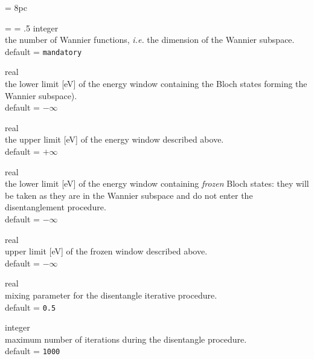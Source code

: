 \newdimen\descindent \descindent = 8pc
{\noindent \leftskip = \descindent \parskip = .5\baselineskip
{}%
{\sc integer} \\ the number of Wannier functions, {\it i.e.} the dimension of the 
Wannier subspace.
\\ {\sc default} = {\tt mandatory} \par

\noindent{}%
{\sc real} \\ the lower limit [eV] of the energy window containing the Bloch states
forming the Wannier subspace).\\ 
{\sc default} = {\tt $-\infty$} \par

\noindent{}%
{\sc real} \\ the upper limit [eV] of the energy window described above.\\ 
{\sc default} = {\tt $+\infty$} \par

\noindent{}%
{\sc real} \\ the lower limit [eV] of the energy window containing {\it frozen} 
Bloch states: they will be taken as they are in the Wannier subspace and do not enter
the disentanglement procedure. \\
{\sc default} = {\tt $-\infty$} \par

\noindent{}%
{\sc real} \\ upper limit [eV] of the frozen window described above.\\ 
{\sc default} = {\tt $-\infty$} \par

\noindent{}%
{\sc real} \\ mixing parameter for the disentangle iterative procedure.\\ 
{\sc default} = {\tt 0.5} \par

\noindent{}%
{\sc integer} \\  maximum number of iterations during the disentangle procedure.\\ 
{\sc default} = {\tt 1000} \par

}
